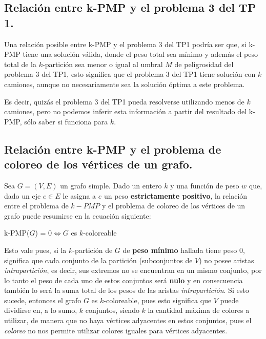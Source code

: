 \subsection{Relación entre k-PMP y el problema 3 del TP 1.}
\vspace*{0.3cm}

Una relación posible entre k-PMP y el problema 3 del TP1 podría ser que, si
k-PMP tiene una solución válida, donde el peso total sea mínimo y además el peso total de la $k$-partición sea menor o igual al umbral $M$ de peligrosidad del problema 3 del TP1, esto significa que el problema 3 del TP1 tiene solución con $k$ camiones, aunque no necesariamente sea la solución óptima a este problema.

Es decir, quizás el problema 3 del TP1 pueda resolverse utilizando menos de $k$
camiones, pero no podemos inferir esta información a partir del resultado del
k-PMP, sólo saber si funciona para $k$.


\newpage
\subsection{Relación entre k-PMP y el problema de coloreo de los vértices de
            un grafo.}
\vspace*{0.3cm}

Sea $G = (V, E)$ un grafo simple. Dado un entero $k$ y una función de peso $w$
que, dado un eje $e \in E$ le asigna a $e$ un peso \textbf{estrictamente positivo},
la relación entre el problema de $k-PMP$ y el problema de coloreo de los vértices
de un grafo puede resumirse en la ecuación siguiente:

\begin{center}
  k-PMP($G$) = $0 \iff G$ es $k$-coloreable
\end{center}

Esto vale pues, si la $k$-partición de $G$ de \textbf{peso mínimo} hallada
tiene peso $0$, significa que cada conjunto de la partición (subconjuntos de $V$)
no posee aristas \textit{intrapartición}, es decir, sus extremos no se encuentran en
un mismo conjunto, por lo tanto el peso de cada uno de estos conjuntos será
\textbf{nulo} y en consecuencia también lo será la suma total de los pesos de
las aristas \textit{intrapartición}. Si esto sucede, entonces el grafo $G$ es
$k$-coloreable, pues esto significa que $V$ puede dividirse en, a lo sumo, $k$
conjuntos, siendo $k$ la cantidad máxima de colores a utilizar, de manera que no
haya vértices adyacentes en estos conjuntos, pues el \textit{coloreo} no nos permite
utilizar colores iguales para vértices adyacentes.

